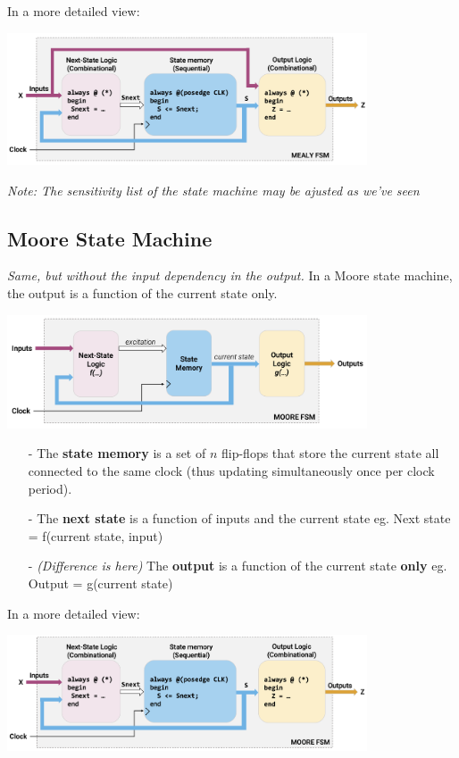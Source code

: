 \documentclass[12pt,openany]{book}
\begin{document}
In a more detailed view: 
\begin{center}
	\includegraphics[width=0.8\textwidth]{circuits/13.1.1_2.png}
\end{center}
\textit{Note: The sensitivity list of the state machine may be ajusted as we've seen} \newline

\newpage
\subsection{Moore State Machine}
\textit{Same, but without the input dependency in the output.}
In a Moore state machine, the output is a function of the current state only.
\begin{center}
	\includegraphics[width=0.8\textwidth]{circuits/13.1.2.png}
\end{center}

\begin{itemize} 
	\item[-] The \textbf{state memory} is a set of $n$ flip-flops that store the current state all connected to the same clock (thus updating simultaneously once per clock period).
	\item[-] The \textbf{next state} is a function of inputs and the current state \newline eg. Next state = f(current state, input) 
	\item[-] \textit{(Difference is here)} The \textbf{output} is a function of the current state \textbf{only} \newline eg. Output = g(current state)
\end{itemize}

In a more detailed view:
\begin{center}
	\includegraphics[width=0.8\textwidth]{circuits/13.1.2_2.png}
\end{center}
\end{document}
